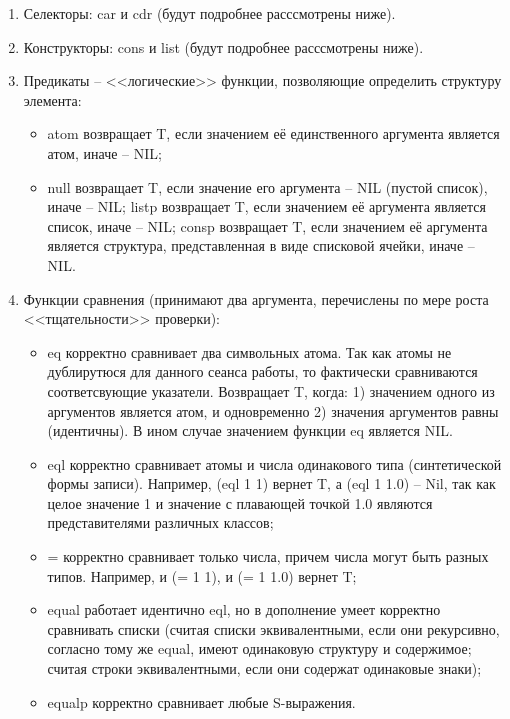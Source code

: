 \documentclass[12pt]{report}
\begin{document}
	\begin{enumerate}
		\item Селекторы: car и cdr (будут подробнее расссмотрены ниже).
		\item Конструкторы: cons и list (будут подробнее расссмотрены ниже).
		\item Предикаты -- <<логические>> функции, позволяющие определить структуру элемента:
		\begin{itemize}
			\item atom возвращает T, если значением её единственного аргумента является атом, иначе -- NIL;
			\item null возвращает T, если значение его аргумента -- NIL (пустой список), иначе -- NIL;
			listp возвращает T, если значением её аргумента является список, иначе -- NIL;
			consp возвращает T, если значением её аргумента является структура, представленная в виде списковой ячейки, иначе -- NIL. 
		\end{itemize}
		\item Функции сравнения (принимают два аргумента, перечислены по мере роста <<тщательности>> проверки):
		\begin{itemize}
			\item eq корректно сравнивает два символьных атома. Так как атомы не дублирутюся для данного сеанса работы, то фактически сравниваются соответсвующие указатели. 
			Возвращает T, когда: 1) значением одного из аргументов является атом, и одновременно 2) значения аргументов равны (идентичны). В ином случае значением функции eq является NIL. 
			\item eql корректно сравнивает атомы и числа одинакового типа (синтетической формы записи). Например, (eql 1 1) вернет T, а (eql 1 1.0) -- Nil, так как целое значение 1 и значение с плавающей точкой 1.0 являются представителями различных классов;
			\item = корректно сравнивает только числа, причем числа могут быть разных типов. Например, и (= 1 1), и (= 1 1.0) вернет T;
			\item equal работает идентично eql, но в дополнение умеет корректно сравнивать списки (считая списки эквивалентными, если они рекурсивно, согласно тому же equal, имеют одинаковую структуру и содержимое; считая строки эквивалентными, если они содержат одинаковые знаки);
			\item equalp корректно сравнивает любые S-выражения. 
		\end{itemize}
	\end{enumerate}
	
\end{document}
